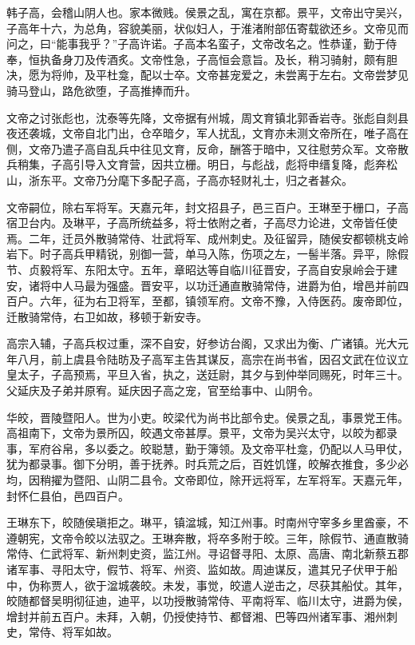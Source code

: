 \documentclass[]{article}
\begin{document}
韩子高，会稽山阴人也。家本微贱。侯景之乱，寓在京都。景平，文帝出守吴兴，子高年十六，为总角，容貌美丽，状似妇人，于淮渚附部伍寄载欲还乡。文帝见而问之，曰``能事我乎？''子高许诺。子高本名蛮子，文帝改名之。性恭谨，勤于侍奉，恒执备身刀及传酒炙。文帝性急，子高恒会意旨。及长，稍习骑射，颇有胆决，愿为将帅，及平杜龛，配以士卒。文帝甚宠爱之，未尝离于左右。文帝尝梦见骑马登山，路危欲堕，子高推捧而升。

文帝之讨张彪也，沈泰等先降，文帝据有州城，周文育镇北郭香岩寺。张彪自剡县夜还袭城，文帝自北门出，仓卒暗夕，军人扰乱，文育亦未测文帝所在，唯子高在侧，文帝乃遣子高自乱兵中往见文育，反命，酬答于暗中，又往慰劳众军。文帝散兵稍集，子高引导入文育营，因共立栅。明日，与彪战，彪将申缙复降，彪奔松山，浙东平。文帝乃分麾下多配子高，子高亦轻财礼士，归之者甚众。

文帝嗣位，除右军将军。天嘉元年，封文招县子，邑三百户。王琳至于栅口，子高宿卫台内。及琳平，子高所统益多，将士依附之者，子高尽力论进，文帝皆任使焉。二年，迁员外散骑常侍、壮武将军、成州刺史。及征留异，随侯安都顿桃支岭岩下。时子高兵甲精锐，别御一营，单马入陈，伤项之左，一髻半落。异平，除假节、贞毅将军、东阳太守。五年，章昭达等自临川征晋安，子高自安泉岭会于建安，诸将中人马最为强盛。晋安平，以功迁通直散骑常侍，进爵为伯，增邑并前四百户。六年，征为右卫将军，至都，镇领军府。文帝不豫，入侍医药。废帝即位，迁散骑常侍，右卫如故，移顿于新安寺。

高宗入辅，子高兵权过重，深不自安，好参访台阁，又求出为衡、广诸镇。光大元年八月，前上虞县令陆昉及子高军主告其谋反，高宗在尚书省，因召文武在位议立皇太子，子高预焉，平旦入省，执之，送廷尉，其夕与到仲举同赐死，时年三十。父延庆及子弟并原宥。延庆因子高之宠，官至给事中、山阴令。

华皎，晋陵暨阳人。世为小吏。皎梁代为尚书比部令史。侯景之乱，事景党王伟。高祖南下，文帝为景所囚，皎遇文帝甚厚。景平，文帝为吴兴太守，以皎为都录事，军府谷帛，多以委之。皎聪慧，勤于簿领。及文帝平杜龛，仍配以人马甲仗，犹为都录事。御下分明，善于抚养。时兵荒之后，百姓饥馑，皎解衣推食，多少必均，因稍擢为暨阳、山阴二县令。文帝即位，除开远将军，左军将军。天嘉元年，封怀仁县伯，邑四百户。

王琳东下，皎随侯瑱拒之。琳平，镇湓城，知江州事。时南州守宰多乡里酋豪，不遵朝宪，文帝令皎以法驭之。王琳奔散，将卒多附于皎。三年，除假节、通直散骑常侍、仁武将军、新州刺史资，监江州。寻诏督寻阳、太原、高唐、南北新蔡五郡诸军事、寻阳太守，假节、将军、州资、监如故。周迪谋反，遣其兄子伏甲于船中，伪称贾人，欲于湓城袭皎。未发，事觉，皎遣人逆击之，尽获其船仗。其年，皎随都督吴明彻征迪，迪平，以功授散骑常侍、平南将军、临川太守，进爵为侯，增封并前五百户。未拜，入朝，仍授使持节、都督湘、巴等四州诸军事、湘州刺史，常侍、将军如故。
\end{document}
